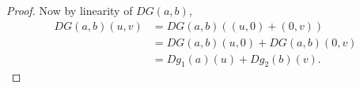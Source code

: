 \begin{itemize}
\begin{proof}
	Now by linearity of $DG(a,b)$,
	\begin{align*}
		DG(a,b)(u,v)
		&= DG(a,b)\left( (u,0)+(0,v) \right)  \\
		&= DG(a,b)(u,0)+DG(a,b)(0,v) \\
		&= D g_1(a)(u) + Dg_2(b)(v)
	.\end{align*} 
\end{proof}

\end{itemize}

